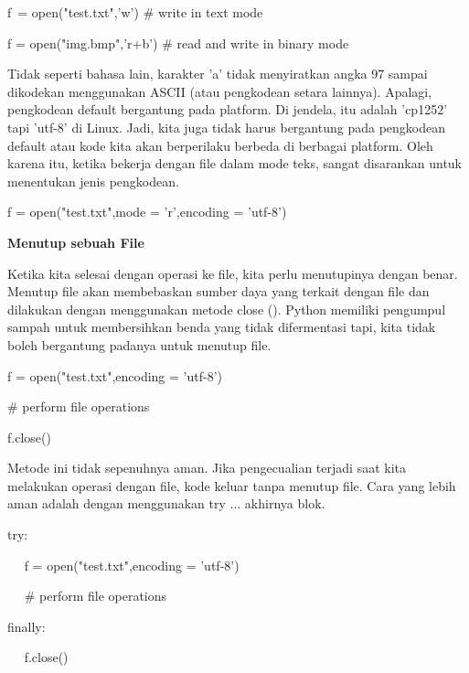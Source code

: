 \noindent 
f~= open("test.txt",'w')   $  \#  $ write in text mode \par
\noindent 
f = open("img.bmp",'r+b')  $  \#  $ read and write in binary mode \par
\vspace{12pt}
\noindent 
Tidak seperti bahasa lain, karakter 'a' tidak menyiratkan angka 97 sampai dikodekan menggunakan ASCII (atau pengkodean setara lainnya). Apalagi, pengkodean default bergantung pada platform. Di jendela, itu adalah 'cp1252' tapi 'utf-8' di Linux. Jadi, kita juga tidak harus bergantung pada pengkodean default atau kode kita akan berperilaku berbeda di berbagai platform. Oleh karena itu, ketika bekerja dengan file dalam mode teks, sangat disarankan untuk menentukan jenis pengkodean. \par
\vspace{12pt}
\noindent 
f = open("test.txt",mode = 'r',encoding = 'utf-8') \par
\vspace{12pt}
\noindent 
{\fontsize{14pt}{14pt}\selectfont \textbf{Menutup sebuah File} \\} \par
Ketika kita selesai dengan operasi ke file, kita perlu menutupinya dengan benar. Menutup file akan membebaskan sumber daya yang terkait dengan file dan dilakukan dengan menggunakan metode close (). Python memiliki pengumpul sampah untuk membersihkan benda yang tidak difermentasi tapi, kita tidak boleh bergantung padanya untuk menutup file. \par
\noindent 
f = open("test.txt",encoding = 'utf-8') \par
\noindent 
$  \#  $ perform file operations \par
\noindent 
f.close() \par
\vspace{12pt}
\noindent 
Metode ini tidak sepenuhnya aman. Jika pengecualian terjadi saat kita melakukan operasi dengan file, kode keluar tanpa menutup file. Cara yang lebih aman adalah dengan menggunakan try ... akhirnya blok. \par
\vspace{12pt}
\noindent 
try: \par
\noindent 
~~ f = open("test.txt",encoding = 'utf-8') \par
\noindent 
~~  $  \#  $ perform file operations \par
\noindent 
finally: \par
\noindent 
~~ f.close() \par
\vspace{12pt}
